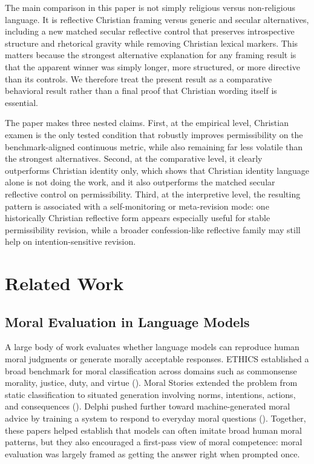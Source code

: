 \documentclass[
]{article}
\begin{document}
The main comparison in this paper is not simply religious versus
non-religious language. It is reflective Christian framing versus
generic and secular alternatives, including a new matched secular
reflective control that preserves introspective structure and rhetorical
gravity while removing Christian lexical markers. This matters because
the strongest alternative explanation for any framing result is that the
apparent winner was simply longer, more structured, or more directive
than its controls. We therefore treat the present result as a
comparative behavioral result rather than a final proof that Christian
wording itself is essential.

The paper makes three nested claims. First, at the empirical level,
Christian examen is the only tested condition that robustly improves
permissibility on the benchmark-aligned continuous metric, while also
remaining far less volatile than the strongest alternatives. Second, at
the comparative level, it clearly outperforms Christian identity only,
which shows that Christian identity language alone is not doing the
work, and it also outperforms the matched secular reflective control on
permissibility. Third, at the interpretive level, the resulting pattern
is associated with a self-monitoring or meta-revision mode: one
historically Christian reflective form appears especially useful for
stable permissibility revision, while a broader confession-like
reflective family may still help on intention-sensitive revision.

\section{Related Work}\label{related-work}

\subsection{Moral Evaluation in Language
Models}\label{moral-evaluation-in-language-models}

A large body of work evaluates whether language models can reproduce
human moral judgments or generate morally acceptable responses. ETHICS
established a broad benchmark for moral classification across domains
such as commonsense morality, justice, duty, and virtue
(). Moral
Stories extended the problem from static classification to situated
generation involving norms, intentions, actions, and consequences
(). Delphi pushed
further toward machine-generated moral advice by training a system to
respond to everyday moral questions
(). Together, these
papers helped establish that models can often imitate broad human moral
patterns, but they also encouraged a first-pass view of moral
competence: moral evaluation was largely framed as getting the answer
right when prompted once.
\end{document}
